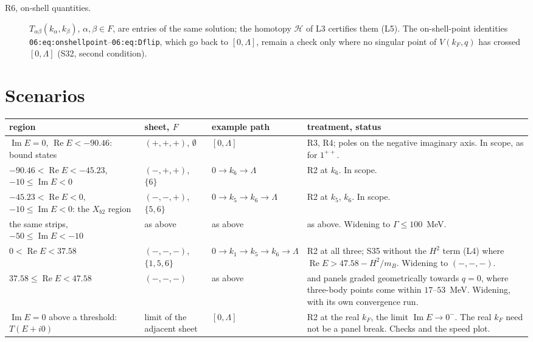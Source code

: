 \documentclass[11pt]{article}
\begin{document}
\begin{description}
\item[R6, on-shell quantities.] $T_{\alpha\beta}(k_\alpha,k_\beta)$, $\alpha,\beta\in F$, are entries of the same solution; the homotopy $\mathcal H$ of L3 certifies them (L5). The on-shell-point identities \texttt{06:eq:onshellpoint}--\texttt{06:eq:Dflip}, which go back to $[0,\Lambda]$, remain a check only where no singular point of $V(k_F,q)$ has crossed $[0,\Lambda]$ (S32, second condition).
\end{description}

\section{Scenarios}

\begin{center}
\small
\begin{tabular}{>{\raggedright\arraybackslash}p{}>{\raggedright\arraybackslash}p{}>{\raggedright\arraybackslash}p{}>{\raggedright\arraybackslash}p{}}
\toprule
region & sheet, $F$ & example path & treatment, status\\
\midrule
$\operatorname{Im}E=0$, $\operatorname{Re}E<-90.46$: bound states & $(+,+,+)$, $\emptyset$ & $[0,\Lambda]$ & R3, R4; poles on the negative imaginary axis. In scope, as for $1^{++}$.\\
$-90.46<\operatorname{Re}E<-45.23$, $-10\le\operatorname{Im}E<0$ & $(-,+,+)$, $\{6\}$ & $0\to k_6\to\Lambda$ & R2 at $k_6$. In scope.\\
$-45.23<\operatorname{Re}E<0$, $-10\le\operatorname{Im}E<0$: the $X_{b2}$ region & $(-,-,+)$, $\{5,6\}$ & $0\to k_5\to k_6\to\Lambda$ & R2 at $k_5$, $k_6$. In scope.\\
the same strips, $-50\le\operatorname{Im}E<-10$ & as above & as above & as above. Widening to $\Gamma\le100$~MeV.\\
$0<\operatorname{Re}E<37.58$ & $(-,-,-)$, $\{1,5,6\}$ & $0\to k_1\to k_5\to k_6\to\Lambda$ & R2 at all three; S35 without the $H^2$ term (L4) where $\operatorname{Re}E>47.58-H^2/m_B$. Widening to $(-,-,-)$.\\
$37.58\le\operatorname{Re}E<47.58$ & $(-,-,-)$ & as above & and panels graded geometrically towards $q=0$, where three-body points come within $17$--$53$~MeV. Widening, with its own convergence run.\\
$\operatorname{Im}E=0$ above a threshold: $T(E+i0)$ & limit of the adjacent sheet & $[0,\Lambda]$ & R2 at the real $k_F$, the limit $\operatorname{Im}E\to0^-$. The real $k_F$ need not be a panel break. Checks and the speed plot.\\

\end{tabular}
\end{center}
\end{document}

